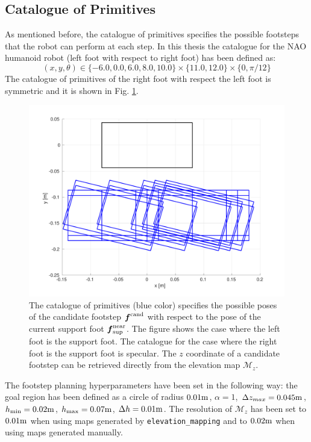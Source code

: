 \subsection{Catalogue of Primitives}
As mentioned before, the catalogue of primitives specifies the possible 
footsteps that the robot can perform at each step. In this thesis the catalogue 
for the NAO humanoid robot (left foot with respect to right foot)
has been defined as:
\begin{equation}
  (x, y, \theta) \in \{ -6.0, 0.0, 6.0, 8.0, 10.0 \} \times
      \{ 11.0, 12.0 \} \times \{ 0, \pi/12 \}
\end{equation}
The catalogue of primitives of the right foot with respect the left foot is 
symmetric and it is shown in Fig. \ref{fig:catalogue-primitives}.
\begin{figure}
    \centering
    \includegraphics[width=\textwidth]{figures/catalogue-primitives.pdf}
    \caption{The catalogue of primitives (blue color) specifies the possible
        poses of the
        candidate footstep ${\mbox{\boldmath $f$}}^{\rm cand}$ with respect to the pose of the 
        current support foot ${\mbox{\boldmath $f$}}_{\rm sup}^{\rm near}$. The figure shows the 
        case where the left foot is the support foot. The catalogue for the 
        case where the right foot is the support foot is specular. The $z$
        coordinate of a candidate footstep can be retrieved directly from 
        the elevation map $\mathcal{M}_z$.}
    \label{fig:catalogue-primitives}
\end{figure}
The footstep planning hyperparameters have been set in the following way:
the goal region has been defined as a circle of radius $0.01 {\rm m}$,
$\alpha=1$,
$\Delta z_{max}=0.045 {\rm m}$, $h_{\min}=0.02 {\rm m}$,
$h_{\max}=0.07 {\rm m}$, $\Delta h=0.01 {\rm m}$.
The resolution of $\mathcal{M}_z$ has been set to $0.01 {\rm m}$ when using maps 
generated by \texttt{elevation\_mapping} and to $0.02 {\rm m}$ when using maps 
generated manually.

